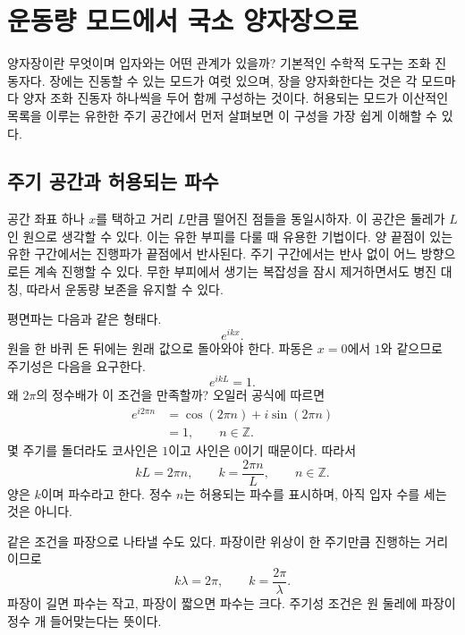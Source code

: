 \chapter{운동량 모드에서 국소 양자장으로}

양자장이란 무엇이며 입자와는 어떤 관계가 있을까? 기본적인 수학적 도구는 조화 진동자다. 장에는 진동할 수 있는 모드가 여럿 있으며, 장을 양자화한다는 것은 각 모드마다 양자 조화 진동자 하나씩을 두어 함께 구성하는 것이다. 허용되는 모드가 이산적인 목록을 이루는 유한한 주기 공간에서 먼저 살펴보면 이 구성을 가장 쉽게 이해할 수 있다.

\section{주기 공간과 허용되는 파수}

공간 좌표 하나 \(x\)를 택하고 거리 \(L\)만큼 떨어진 점들을 동일시하자. 이 공간은 둘레가 \(L\)인 원으로 생각할 수 있다. 이는 유한 부피를 다룰 때 유용한 기법이다. 양 끝점이 있는 유한 구간에서는 진행파가 끝점에서 반사된다. 주기 구간에서는 반사 없이 어느 방향으로든 계속 진행할 수 있다. 무한 부피에서 생기는 복잡성을 잠시 제거하면서도 병진 대칭, 따라서 운동량 보존을 유지할 수 있다.

평면파는 다음과 같은 형태다.
\begin{equation}
e^{ikx}.
\end{equation}
원을 한 바퀴 돈 뒤에는 원래 값으로 돌아와야 한다. 파동은 \(x=0\)에서 \(1\)와 같으므로 주기성은 다음을 요구한다.
\begin{equation}
e^{ikL}=1.
\end{equation}
왜 \(2\pi\)의 정수배가 이 조건을 만족할까? 오일러 공식에 따르면
\begin{align}
e^{i2\pi n}
&=\cos(2\pi n)+i\sin(2\pi n)\\
&=1,
\qquad n\in\mathbb Z.
\end{align}
몇 주기를 돌더라도 코사인은 \(1\)이고 사인은 \(0\)이기 때문이다. 따라서
\begin{equation}
kL=2\pi n,
\qquad
k=\frac{2\pi n}{L},
\qquad n\in\mathbb Z.
\end{equation}
양은 \(k\)이며 파수라고 한다. 정수 \(n\)는 허용되는 파수를 표시하며, 아직 입자 수를 세는 것은 아니다.

같은 조건을 파장으로 나타낼 수도 있다. 파장이란 위상이 한 주기만큼 진행하는 거리이므로
\begin{equation}
k\lambda=2\pi,
\qquad
k=\frac{2\pi}{\lambda}.
\end{equation}
파장이 길면 파수는 작고, 파장이 짧으면 파수는 크다. 주기성 조건은 원 둘레에 파장이 정수 개 들어맞는다는 뜻이다.

